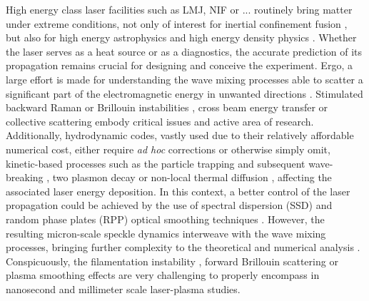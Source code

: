 \documentclass[
 reprint,
 amsmath,amssymb,
 aps,
]{revtex4-1}
\begin{document}
High energy class laser facilities such as LMJ,  NIF or ... routinely bring matter under extreme conditions, not only of interest for inertial confinement fusion \cite{Lindl_2004,SChina_Wang_2017,Cavailler_2005}, but also for high energy astrophysics \cite{Drake_2012} and high energy density physics   \cite{Drake2006}. 
Whether  the laser   serves as a heat source or as a diagnostics, the accurate prediction of its propagation remains crucial for designing and  conceive the experiment. Ergo, a large effort is made for understanding the wave mixing processes able to scatter a significant part of the electromagnetic energy in unwanted directions \cite[]{Shen_1965,Forslund_1973}. Stimulated backward Raman or Brillouin instabilities  \cite{POP_Liu_2009,hao_2013},  cross beam energy transfer \cite{hao_2016}  or collective scattering  \cite[]{PRL_Neuville_2016,PRL_Depierreux_2016} embody critical issues and active area of research.
Additionally, hydrodynamic codes, vastly used due to their relatively affordable numerical cost, either require \emph{ad hoc} corrections or otherwise simply  omit, kinetic-based processes such as the particle trapping and subsequent wave-breaking \cite[]{POP_Benisti_2008,POP_Berger_2013}, two plasmon decay \cite[]{Dubois_1995,Russell_2001} or non-local thermal diffusion \cite[]{POP_Schurtz_2000,PRL_Froula_2007}, affecting the associated laser energy deposition. 
In this context, a better control of the laser propagation could be achieved by the use of spectral dispersion (SSD) and  random phase plates (RPP) optical smoothing techniques  \cite[]{Kato_1984,NatPhys_Glenzer,NatPhys_Labaune}.  
However, the resulting micron-scale speckle dynamics  interweave with the wave mixing processes, bringing further complexity to the theoretical and numerical analysis \cite[]{POP_Duluc_2019}. 
Conspicuously, the filamentation instability \cite[]{phd_Michel,POP_michel_2003,Lushnikov_2006,PRL_Sarri_2011}, forward Brillouin  scattering or plasma smoothing effects \cite[]{phd-Grech,POP_Grech_2006,PRL_Grech_2009} 
are very challenging to properly encompass  in nanosecond and millimeter scale laser-plasma studies.
\end{document}
